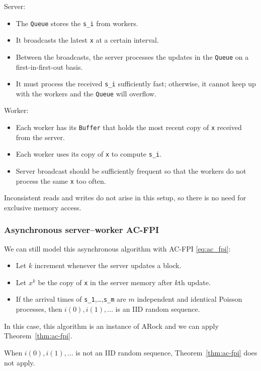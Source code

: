 \documentclass[10pt,mathserif]{beamer}
\begin{document}
\begin{frame}[fragile]

Server:
\begin{itemize}
    \item The \verb|Queue| stores the \verb!s_i! from workers.
    \item It broadcasts the latest \verb!x! at a certain interval.
    \item Between the broadcasts, the server processes the updates in the \verb|Queue| on a first-in-first-out basis.
    \item It must process the received \verb!s_i! sufficiently fast; otherwise, it cannot keep up with the workers and the \verb|Queue| will overflow.
\end{itemize}
\medskip

Worker:
\begin{itemize}
    \item Each worker has its \verb|Buffer| that holds the most recent copy of \verb|x| received from the server.
    \item Each worker uses its copy of \verb|x| to compute \verb!s_i!.
    \item Server broadcast should be sufficiently frequent so that the workers do not process the same \verb|x| too often.
\end{itemize}
\medskip

Inconsistent reads and writes do not arise in this setup, so there is no need for exclusive memory access.

\end{frame}



\begin{frame}[fragile]
\frametitle{Asynchronous server--worker AC-FPI}
We can still model this asynchronous algorithm with AC-FPI \eqref{eq:ac_fpi}:
\begin{itemize}
    \item Let $k$ increment whenever the server updates a block.
    \item Let $x^k$ be the copy of \verb!x! in the server memory after $k$th update.
    \item If the arrival times of \verb!s_1!,\dots,\verb!s_m! are $m$ independent and identical Poisson processes, then  $i(0),i(1),\dots$ is an IID random sequence.
\end{itemize}
In this case, this algorithm is an instance of ARock and we can apply Theorem~\ref{thm:ac-fpi}.
\bigskip

When $i(0),i(1),\dots$ is not an IID random sequence, Theorem~\ref{thm:ac-fpi} does not apply.
\end{frame}
\end{document}
